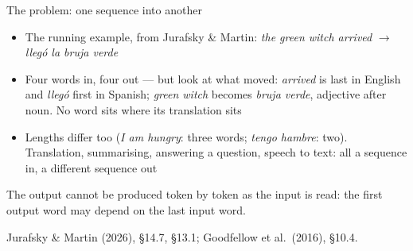 \documentclass[aspectratio=169, 11pt]{beamer}
\newcommand{\srcline}[1]{%
  \par\vspace{0.25em}%
  {\scriptsize\color{mcMuted}\hfill #1\par}}
\newcommand{\src}[3]{}      %
\begin{document}
\begin{frame}{The problem: one sequence into another}
  \src{jurafsky_slp3}{section}{14.7}
  \src{jurafsky_slp3}{section}{13.1.1}
  \src{goodfellow2016}{section}{10.4}
  \vspace{0.05em}
  {\footnotesize
  \begin{itemize}\itemsep0.25em
    \item The running example, from Jurafsky \& Martin:
          \emph{the green witch arrived} $\longrightarrow$ \emph{lleg\'o la bruja verde}
    \item Four words in, four out --- but look at what moved: \emph{arrived}
          is last in English and \emph{lleg\'o} \alert{first} in Spanish;
          \emph{green witch} becomes \emph{bruja verde}, adjective after
          noun. No word sits where its translation sits
    \item Lengths differ too (\emph{I am hungry}: three words; \emph{tengo
          hambre}: two). Translation, summarising, answering a question,
          speech to text: all \alert{a sequence in, a different sequence out}
  \end{itemize}}
  \vspace{0.1em}
  \begin{redhighlight}
    The output cannot be produced token by token as the input is read:
    the first output word may depend on the last input word.
  \end{redhighlight}
  \srcline{Jurafsky \& Martin (2026), \S14.7, \S13.1; Goodfellow et al.\ (2016), \S10.4.}
\end{frame}
\end{document}
